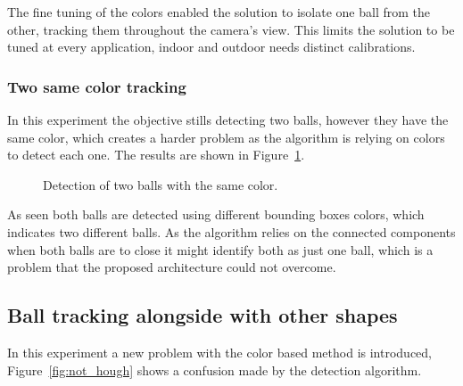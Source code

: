 \documentclass[10pt,twocolumn,letterpaper]{article}
\begin{document}
The fine tuning of the colors enabled the solution to isolate one ball from the other, tracking them throughout the camera's view. This limits the solution to be tuned at every application, indoor  and outdoor needs
distinct calibrations.

\subsubsection{Two same color tracking}

In this experiment the objective stills detecting two balls, however they have the same color, which creates a harder problem as the algorithm is relying on colors to detect each one. The results are shown in Figure~\ref{fig:same_color}.

\begin{figure}[!h]
\centering
\setlength{\fboxsep}{1pt}
\setlength{\fboxrule}{1pt}
\caption{Detection of two balls with the same color.}\label{fig:same_color}
\end{figure}

As seen both balls are detected using different bounding boxes colors, which indicates two different balls. As the algorithm relies on the connected components when both balls are to close it might identify both as just one ball, which is a problem that the proposed architecture could not overcome.

\subsection{Ball tracking alongside with other shapes}

In this experiment a new problem with the color based method is introduced, Figure~\ref{fig:not_hough} shows a confusion made by the detection algorithm.
\end{document}
